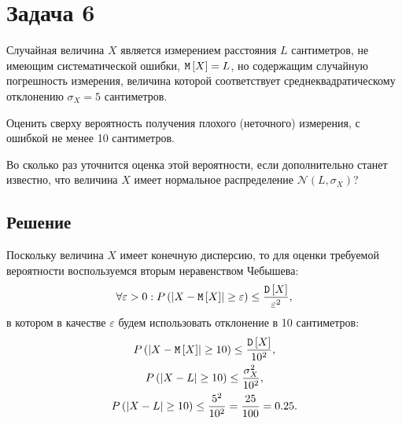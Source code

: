 \section*{Задача 6}

Случайная величина $X$ является измерением расстояния $L$ сантиметров, не имеющим систематической ошибки, $\mathtt{M} \left [ X \right ] = L$, но содержащим случайную погрешность
измерения, величина которой соответствует среднеквадратическому отклонению $\sigma_X = 5$ сантиметров.

Оценить сверху вероятность получения плохого (неточного) измерения, с ошибкой не менее 10 сантиметров.

Во сколько раз уточнится оценка этой вероятности, если дополнительно станет известно, что величина $X$ имеет нормальное распределение $\mathcal{N} ( L, \sigma_X)$?

\subsection*{Решение}
Поскольку величина $X$ имеет конечную дисперсию, то для оценки требуемой вероятности воспользуемся вторым неравенством Чебышева:
\begin{equation}
    \forall \varepsilon > 0 : P \left (  \left | X - \mathtt{M} \left [ X \right ] \right | \ge \varepsilon  \right ) \le \frac{\mathtt{D} \left [ X \right ]}{\varepsilon^2} ,
\end{equation}
в котором в качестве $\varepsilon$ будем использовать отклонение в 10 сантиметров:
\begin{gather}
    P \left (  \left | X - \mathtt{M} \left [ X \right ] \right | \ge 10  \right ) \le \frac{\mathtt{D} \left [ X \right ]}{10^2} , \\
    P \left (  \left | X - L \right | \ge 10  \right ) \le \frac{\sigma_X^2}{10^2} , \\
    P \left (  \left | X - L \right | \ge 10  \right ) \le \frac{5^2}{10^2} = \frac{25}{100} = 0.25 \label{2:bound}.
\end{gather}

